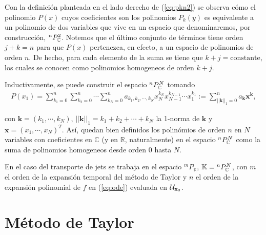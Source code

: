 Con la definición planteada en el lado derecho de (\ref{eq:pkn2}) se observa cómo el polinomio $P(x)$ cuyos coeficientes son los polinomios $P_k(y)$ es equivalente a un polinomio de dos variables que vive en un espacio que denominaremos, por construcción, ${^{n}P_{\mathbb{C}}^ 2 }$. Notemos que el último conjunto de términos tiene orden $j+k = n$ para que $P(x)$  pertenezca, en efecto, a un espacio de polinomios de orden $n$. De hecho, para cada elemento de la suma se tiene que $k+j= \text{constante}$, los cuales se conocen como polinomios homogeneos de orden $k+j$.

Inductivamente, se puede construir el espacio ${^{n}P_{\mathbb{C}}^ N }$ tomando
\begin{align}
 P(x_1) = \sum_{k_{1}=0}^n\sum_{k_2=0}^n\cdots\sum_{k_N=0}^n a_{k_{1},k_{2},\cdots,k_{N}}x_N^{k_{N}}x_{N-1}^{k_{N-1}} \cdots x_1^{k_{1}} := \sum_{||\mathbf{k}||_{1}=0}^n a_{\mathbf{k}}\mathbf{x}^{\mathbf{k}},
\label{eq:pknN}
\end{align}

con $\mathbf{k} = (k_1,\cdots,k_N)$, $||\mathbf{k}||_1 = k_1+k_2+\cdots+k_N$ la 1-norma de $\mathbf{k}$ y $\mathbf{x} = (x_1,\cdots,x_N)^T$. Así, quedan bien definidos los polinómios de orden $n$ en $N$ variables con coeficientes en $\mathbb{C}$ (y en $\mathbb{R}$, naturalmente) en el espacio ${^{n}P_{\mathbb{C}}^ N }$ como la suma de polinomios homogeneos desde orden $0$ hasta $N$.


En el caso del transporte de jets se trabaja en el espacio ${^{m}P_{\mathbb{K}}}$, $\mathbb{K} = {^{n}P_{\mathbb{C}}^ N }$, con $m$ el orden de la expansión temporal del método de Taylor y $n$ el orden de la expansión polinomial de $f$ en (\ref{eq:ode}) evaluada en $\mathcal{U}_{\mathbf{x}_0}$. 

\section{Método de Taylor}
\label{sec:taylor-metodo}

